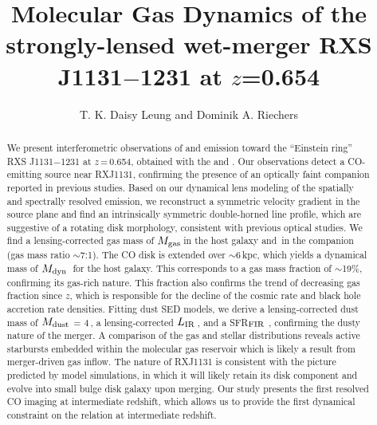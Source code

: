 \documentclass[]{emulateapj}
\begin{document}

\title{Molecular Gas Dynamics of the strongly-lensed wet-merger RXS J1131$-$1231 at $z$=0.654}
\author{T. K. Daisy Leung and Dominik A. Riechers}


\begin{abstract}
We present interferometric observations of \bco and \cco emission toward the ``Einstein ring''
RXS J1131$-$1231 at $z$\,=\,0.654, obtained with the \pdbi and \carma. 
Our observations detect a CO-emitting source near RXJ1131, confirming the presence of an optically 
faint companion reported in previous studies. 
Based on our dynamical lens modeling of the spatially and spectrally resolved \bco emission, 
we reconstruct a symmetric velocity gradient in the source plane and 
find an intrinsically symmetric double-horned line profile, which are suggestive of a 
rotating disk morphology, consistent with previous optical studies.
We find a lensing-corrected gas mass of $M_{\rm gas}$\,\Msun in the host galaxy and 
\,\Msun in the companion (gas mass ratio $\sim$7:1). 
The CO disk is extended over $\sim$6\,kpc, which yields a dynamical mass of $M_{\rm dyn}$\,\Msun
for the host galaxy. This corresponds to a gas mass fraction of $\sim$19\%, confirming its gas-rich nature.
This fraction also confirms the trend of decreasing gas fraction since $z$, which is responsible for the decline of
the cosmic \SF rate and black hole accretion rate densities.
Fitting dust SED models, we derive a lensing-corrected dust mass of $M_{\rm dust}$ = 4\,\Msun, a 
lensing-corrected $L_{\rm IR}$\,\Lsun, and a SFR$_{\rm FIR}$ \sfrU, 
confirming the dusty nature of the merger.
A comparison of the gas and stellar distributions reveals active starbursts embedded 
within the molecular gas reservoir which is likely a result from merger-driven gas inflow.
The nature of RXJ1131 is consistent with the picture predicted by model simulations, in which it will 
likely retain its disk component and evolve into small bulge disk galaxy upon merging.
Our study presents the first resolved CO imaging at intermediate redshift, 
which allows us to provide the first dynamical constraint on the \bhrelation relation at intermediate redshift.
\end{abstract}
\end{document}
